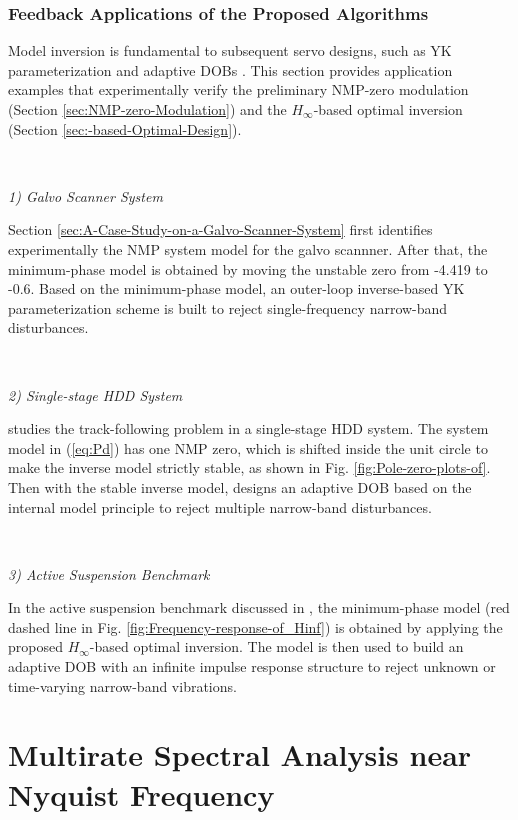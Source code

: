 \documentclass [11pt, proquest] {uwthesis}[2020/02/24]
\begin{document}
\subsection{\label{subsec:Feedback-applications-of}Feedback Applications of
the Proposed Algorithms}

Model inversion is fundamental to subsequent servo designs, such as
YK parameterization and adaptive DOBs \cite{jiang2019local,Ohnishi1993,chen2011minimum,apte2019disturbance,wang2017tutorial}.
This section provides application examples that experimentally verify
the preliminary NMP-zero modulation (Section \ref{sec:NMP-zero-Modulation})
and the $H_{\infty}$-based optimal inversion (Section \ref{sec:-based-Optimal-Design}).

\

\noindent \emph{1) Galvo Scanner System}

Section \ref{sec:A-Case-Study-on-a-Galvo-Scanner-System} first identifies experimentally
the NMP system model for the galvo scannner. After that, the minimum-phase model is obtained
by moving the unstable zero from -4.419 to -0.6. Based on the minimum-phase
model, an outer-loop inverse-based
YK parameterization scheme is built to reject single-frequency narrow-band
disturbances. 

\

\noindent \emph{2) Single-stage HDD System}

\cite{chen2011minimum} studies the track-following problem in a single-stage
HDD system. The system model in (\ref{eq:Pd}) has one NMP zero, which
is shifted inside the unit circle to make the inverse model strictly
stable, as shown in Fig. \ref{fig:Pole-zero-plots-of}. Then with
the stable inverse model, \cite{chen2011minimum} designs an adaptive
DOB based on the internal model principle to reject
multiple narrow-band disturbances.

\

\noindent \emph{3) Active Suspension Benchmark}

In the active suspension benchmark discussed in \cite{chen_selective_2013-1},
the minimum-phase model (red dashed line in Fig. \ref{fig:Frequency-response-of_Hinf})
is obtained by applying the proposed $H_{\infty}$-based optimal inversion.
The model is then used to build an adaptive DOB with
an infinite impulse response structure to reject unknown or time-varying
narrow-band vibrations.



\chapter{Multirate Spectral Analysis near Nyquist Frequency} \label{chap:Spectral-Analysis}
\end{document}
